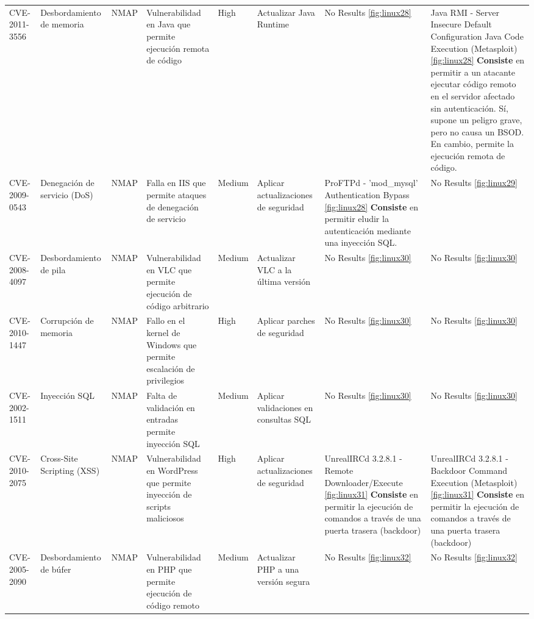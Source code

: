 \documentclass[a4paper,12pt]{article} %
\begin{document}
\begin{table}[hp!]
{\begin{tabular}{m{2.1cm}|m{2.6cm}|m{2cm}|m{4cm}|m{1cm}|m{3cm}|m{5cm}|m{5cm}}
  {CVE-2011-3556} & {Desbordamiento de memoria} & {NMAP} & {Vulnerabilidad en Java que permite ejecución remota de código} & {High} & {Actualizar Java Runtime} & {No Results \ref{fig:linux28}} & { Java RMI - Server Insecure Default Configuration Java Code Execution (Metasploit)\ref{fig:linux28} \vspace{2mm} \hline \vspace{2mm} {\color{blue} \textbf{Consiste} en permitir a un atacante ejecutar código remoto en el servidor afectado sin autenticación.} \vspace{2mm} \hline \vspace{2mm} {\color{red} Sí, supone un peligro grave, pero no causa un BSOD. En cambio, permite la ejecución remota de código.}}\\
  {CVE-2009-0543} & {Denegación de servicio (DoS)} & {NMAP} & {Falla en IIS que permite ataques de denegación de servicio} & {Medium} & {Aplicar actualizaciones de seguridad} & { ProFTPd - 'mod\_mysql' Authentication Bypass \ref{fig:linux28} \hline \vspace{2mm} {\color{blue} \textbf{Consiste} en permitir eludir la autenticación mediante una inyección SQL. }} & { No Results \ref{fig:linux29}}\\
  {CVE-2008-4097} & {Desbordamiento de pila} & {NMAP} & {Vulnerabilidad en VLC que permite ejecución de código arbitrario} & {Medium} & {Actualizar VLC a la última versión} & { No Results \ref{fig:linux30}}& { No Results \ref{fig:linux30}} \\
  {CVE-2010-1447} & {Corrupción de memoria} & {NMAP} & {Fallo en el kernel de Windows que permite escalación de privilegios} & {High} & {Aplicar parches de seguridad} & { No Results \ref{fig:linux30}}& { No Results \ref{fig:linux30}}\\
  {CVE-2002-1511} & {Inyección SQL} & {NMAP} & {Falta de validación en entradas permite inyección SQL} & {Medium} & {Aplicar validaciones en consultas SQL} & { No Results \ref{fig:linux30}}& { No Results \ref{fig:linux30}} \\
  {CVE-2010-2075} & {Cross-Site Scripting (XSS)} & {NMAP} & {Vulnerabilidad en WordPress que permite inyección de scripts maliciosos} & {High} & {Aplicar actualizaciones de seguridad} & { UnrealIRCd 3.2.8.1 - Remote Downloader/Execute \ref{fig:linux31} \hline \vspace{2mm} {\color{blue} \textbf{Consiste} en permitir la ejecución de comandos a través de una puerta trasera (backdoor) }} & {UnrealIRCd 3.2.8.1 - Backdoor Command Execution (Metasploit)  \ref{fig:linux31}  \hline \vspace{2mm} {\color{blue} \textbf{Consiste} en permitir la ejecución de comandos a través de una puerta trasera (backdoor) }} \\
  {CVE-2005-2090} & {Desbordamiento de búfer} & {NMAP} & {Vulnerabilidad en PHP que permite ejecución de código remoto} & {Medium} & {Actualizar PHP a una versión segura} & {No Results \ref{fig:linux32} }  & {No Results \ref{fig:linux32} } \\
  

\end{tabular}}
\end{table}
\end{document}
